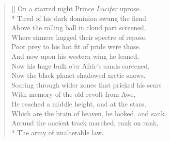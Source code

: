 \settowidth{\versewidth}{\vin \vin Around the ancient track marched, rank on rank,}
\begin{verse}[\versewidth]
On a starred night Prince \textit{Lucifer} uprose.\\*
\vin Tired of his dark dominion swung the fiend\\
\vin Above the rolling ball in cloud part screened,\\
Where sinners hugged their spectre of repose.\\
Poor prey to his hot fit of pride were those.\\
\vin And now upon his western wing he leaned,\\
\vin Now his huge bulk o'er Afric's sands careened,\\
Now the black planet shadowed arctic snows.\\
Soaring through wider zones that pricked his scars\\
\vin With memory of the old revolt from Awe,\\
He reached a middle height, and at the stars,\\
\vin \vin Which are the brain of heaven, he looked, and sank.\nobreak\\
\vin \vin Around the ancient track marched, rank on rank,\\*
\vin The army of unalterable law.
\end{verse}
